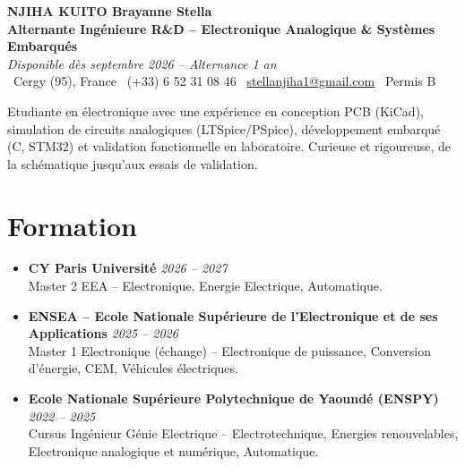 \documentclass[a4paper,11pt]{article}
\begin{document}
\begin{center}
    {\large \textbf{NJIHA KUITO Brayanne Stella}} \\ \vspace{2pt}
    \textbf{Alternante Ingénieure R\&D -- Electronique Analogique \& Systèmes Embarqués} \\
    \textit{\small Disponible dès septembre 2026 -- Alternance 1 an} \\ \vspace{2pt}
    \small
    \faMapMarker\ Cergy (95), France \quad
    \faPhone\ (+33) 6 52 31 08 46 \quad
    \faEnvelope\ \href{mailto:stellanjiha1@gmail.com}{stellanjiha1@gmail.com} \quad
    \faCar\ Permis B
\end{center}

\vspace{-2pt}

\noindent\small{Etudiante en électronique avec une expérience en conception PCB (KiCad), simulation de circuits analogiques (LTSpice/PSpice), développement embarqué (C, STM32) et validation fonctionnelle en laboratoire. Curieuse et rigoureuse, de la schématique jusqu'aux essais de validation.}

\vspace{2pt}

\section{Formation}
\begin{itemize}[leftmargin=*, label=\tiny$\bullet$, nosep]
    \item \textbf{CY Paris Université} \hfill \textit{2026 -- 2027} \\
    \small{Master 2 EEA -- Electronique, Energie Electrique, Automatique.}
    \item \textbf{ENSEA -- Ecole Nationale Supérieure de l'Electronique et de ses Applications} \hfill \textit{2025 -- 2026} \\
    \small{Master 1 Electronique (échange) -- Electronique de puissance, Conversion d'énergie, CEM, Véhicules électriques.}
    \item \textbf{Ecole Nationale Supérieure Polytechnique de Yaoundé (ENSPY)} \hfill \textit{2022 -- 2025} \\
    \small{Cursus Ingénieur Génie Electrique -- Electrotechnique, Energies renouvelables, Electronique analogique et numérique, Automatique.}
\end{itemize}
\end{document}
